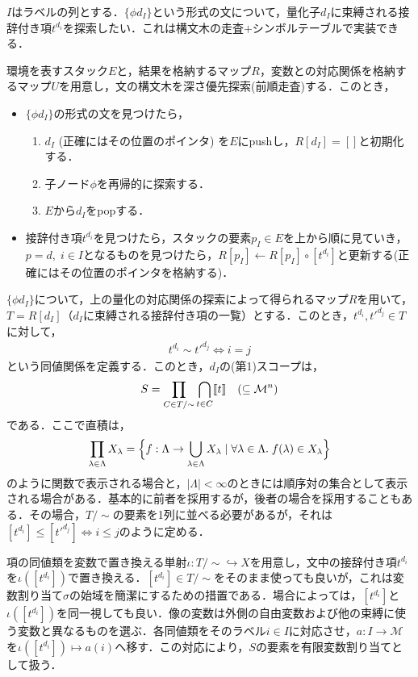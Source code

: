 \documentclass[../../main-detail.tex]{subfiles}
\begin{document}
$I$はラベルの列とする．$\{\phi d_I\}$という形式の文について，量化子$d_I$に束縛される接辞付き項$t^{d_i}$を探索したい．これは構文木の走査$+$シンボルテーブルで実装できる．
\begin{definition}[量化の対応関係の探索]
    環境を表すスタック$E$と，結果を格納するマップ$R$，変数との対応関係を格納するマップ$U$を用意し，文の構文木を深さ優先探索(前順走査)する．このとき，
    \begin{itemize}
        \item $\{\phi d_I\}$の形式の文を見つけたら，
        \begin{enumerate}[label=(\arabic*)]
            \item $d_I$ (正確にはその位置のポインタ) を$E$にpushし，$R[d_I] = []$と初期化する．
            \item 子ノード$\phi$を再帰的に探索する．
            \item $E$から$d_I$をpopする．
        \end{enumerate}
        \item 接辞付き項$t^{d_i}$を見つけたら，スタックの要素$p_I\in E$を上から順に見ていき，$p = d,\; i\in I$となるものを見つけたら，$R[p_I] \leftarrow R[p_I] \circ [t^{d_i}]$と更新する(正確にはその位置のポインタを格納する)．
    \end{itemize}
\end{definition}
\begin{definition}[スコープの決定]
    $\{\phi d_I\}$について，上の量化の対応関係の探索によって得られるマップ$R$を用いて，$T = R[d_I]$（$d_I$に束縛される接辞付き項の一覧）とする．このとき，$t^{d_i}, {t'}^{d_j}\in T$に対して，
    \begin{align*}
        t^{d_i} \sim {t'}^{d_j} \iff i = j
    \end{align*}
    という同値関係を定義する．このとき，$d_I$の(第1)スコープは，
    \[
       S = \prod_{C \in T/{\sim}} \bigcap_{t \in C}\llbracket t\rrbracket\quad  (\subseteq \mathcal{M}^n)
    \]
    である．ここで直積は，
    \[
    \prod_{\lambda\in \Lambda} X_\lambda = \Bigl\{f:\Lambda \to \bigcup_{\lambda\in \Lambda} X_\lambda \mid \forall \lambda\in \Lambda.\; f(\lambda) \in X_\lambda\Bigr\}
    \]
    のように関数で表示される場合と，$|\Lambda| < \infty$のときには順序対の集合として表示される場合がある．基本的に前者を採用するが，後者の場合を採用することもある．その場合，$T/{\sim}$の要素を1列に並べる必要があるが，それは$[t^{d_i}] \leq [{t'}^{d_j}] \iff i \leq j$のように定める．
\end{definition}

\begin{definition}[変数への置き換え]
    項の同値類を変数で置き換える単射$\iota : T/{\sim} \hookrightarrow X$を用意し，文中の接辞付き項$t^{d_i}$を$\iota([t^{d_i}])$で置き換える．$[t^{d_i}]\in T/{\sim}$をそのまま使っても良いが，これは変数割り当て$\sigma$の始域を簡潔にするための措置である．場合によっては，$[t^{d_i}]$と$\iota([t^{d_i}])$を同一視しても良い．像の変数は外側の自由変数および他の束縛に使う変数と異なるものを選ぶ．各同値類をそのラベル$i\in I$に対応させ，$a:I\to\mathcal M$を$\iota([t^{d_i}])\mapsto a(i)$へ移す．この対応により，$S$の要素を有限変数割り当てとして扱う．
\end{definition}
\end{document}
